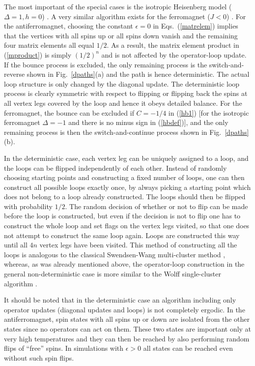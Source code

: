 \documentclass[10pt,pre,aps,twocolumn,showpacs,superscriptaddress,
floatfix]{revtex4}
\begin{document}
The most important of the special cases is the isotropic Heisenberg model 
($\Delta=1,h=0$) \cite{sse3}. A very similar algorithm exists for the
ferromagnet ($J < 0$) \cite{henelius}. For the antiferromagnet, choosing the 
constant $\epsilon=0$ in Eqs.~(\ref{matrelem}) implies that the vertices with 
all spins up or all spins down vanish and the remaining four matrix elements 
all equal $1/2$. As a result, the matrix element product in (\ref{mproduct}) 
is simply $(1/2)^n$ and is not affected by the operator-loop update. If the 
bounce process is excluded, the only remaining process is the 
switch-and-reverse shown in Fig.~\ref{dpaths}(a) and the path is hence 
deterministic. The actual loop structure is only changed by the 
diagonal update. The deterministic 
loop process is clearly symmetric with respect to flipping or flipping back 
the spins at all vertex legs covered by the loop  and hence it obeys 
detailed balance. For the ferromagnet, the bounce can be excluded 
if $C=-1/4$ in (\ref{hb1}) [for the isotropic ferromagnet $\Delta
= -1$ and there is no minus sign in (\ref{hbdef})], and the only remaining 
process is then the switch-and-continue process shown in 
Fig.~\ref{dpaths}(b).
 
In the deterministic case, each vertex leg can be uniquely assigned to a loop,
and the loops can be flipped 
independently of each other. Instead of randomly choosing starting points 
and constructing a fixed number of loops, one can then construct all possible 
loops exactly once, by always picking a starting point which does not belong 
to a loop already constructed. The loops should then be flipped with 
probability $1/2$. The random decision of whether or not to flip can be made 
before the loop is constructed, but even if the decision is not to flip one 
has to construct the whole loop and set flags on the vertex legs visited, so 
that one does not attempt to construct the same loop again. Loops are 
constructed this way until all $4n$ vertex legs have been visited. This method
of constructing all the loops is analogous to the classical Swendsen-Wang 
multi-cluster method \cite{swendsen}, whereas, as was already mentioned above,
the operator-loop construction in the general non-deterministic case is more 
similar to the Wolff single-cluster algorithm \cite{wolff}. 

It should be 
noted that in the deterministic case an algorithm including only operator
updates (diagonal updates and loops) is not completely ergodic. In the
antiferromagnet, spin states with all spins up or down are isolated from the 
other states since no operators can act on them. These two states are 
important only at very high temperatures and they can then be reached by also 
performing random flips of ``free'' spins. In simulations with $\epsilon > 0$ 
all states can be reached even without such spin flips.
\end{document}
